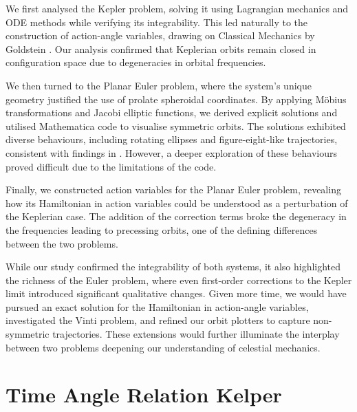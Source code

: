 \documentclass[12pt,oneside]{report}
\theoremstyle{definition}
\begin{document}
We first analysed the Kepler problem, solving it using Lagrangian mechanics and ODE methods while verifying its integrability. This led naturally to the construction of action-angle variables, drawing on Classical Mechanics by Goldstein \cite{goldstein2002classical}. Our analysis confirmed that Keplerian orbits remain closed in configuration space due to degeneracies in orbital frequencies.

We then turned to the Planar Euler problem, where the system’s unique geometry justified the use of prolate spheroidal coordinates. By applying Möbius transformations and Jacobi elliptic functions, we derived explicit solutions and utilised Mathematica code to visualise symmetric orbits. The solutions exhibited diverse behaviours, including rotating ellipses and figure-eight-like trajectories, consistent with findings in \cite{o2008integrable}. However, a deeper exploration of these behaviours proved difficult due to the limitations of the code.

Finally, we constructed action variables for the Planar Euler problem, revealing how its Hamiltonian in action variables could be understood as a perturbation of the Keplerian case. The addition of the correction terms broke the degeneracy in the frequencies leading to precessing orbits, one of the defining differences between the two problems.

While our study confirmed the integrability of both systems, it also highlighted the richness of the Euler problem, where even first-order corrections to the Kepler limit introduced significant qualitative changes. Given more time, we would have pursued an exact solution for the Hamiltonian in action-angle variables, investigated the Vinti problem, and refined our orbit plotters to capture non-symmetric trajectories. These extensions would further illuminate the interplay between two problems deepening our understanding of celestial mechanics.






\appendix
{} %

\chapter{Time Angle Relation Kelper}\label{appendix1}
\end{document}
